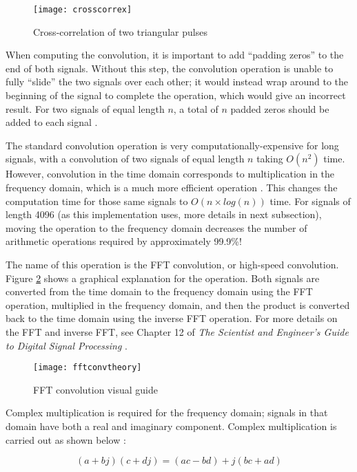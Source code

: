 \documentclass[11pt]{ucthesisCP}
\begin{document}
\begin{figure}[htbp]
	\centering
	\texttt{[image: crosscorrex]}
	\caption{Cross-correlation of two triangular pulses}
	\label{fig:crosscorrex}
\end{figure}

When computing the convolution, it is important to add “padding zeros” to the end of both signals. Without this step, the convolution operation is unable to fully “slide” the two signals over each other; it would instead wrap around to the beginning of the signal to complete the operation, which would give an incorrect result. For two signals of equal length \(n\), a total of \(n\) padded zeros should be added to each signal \cite{dspguide}.

The standard convolution operation is very computationally-expensive for long signals, with a convolution of two signals of equal length \(n\) taking \(O(n^2)\) time. However, convolution in the time domain corresponds to multiplication in the frequency domain, which is a much more efficient operation \cite{dspguide}. This changes the computation time for those same signals to \(O(n \times log(n))\) time. For signals of length 4096 (as this implementation uses, more details in next subsection), moving the operation to the frequency domain decreases the number of arithmetic operations required by approximately 99.9\%!

The name of this operation is the FFT convolution, or high-speed convolution. Figure \ref{fig:fftconvtheory} shows a graphical explanation for the operation. Both signals are converted from the time domain to the frequency domain using the FFT operation, multiplied in the frequency domain, and then the product is converted back to the time domain using the inverse FFT operation. For more details on the FFT and inverse FFT, see Chapter 12 of \textit{The Scientist and Engineer’s Guide to Digital Signal Processing} \cite{dspguide}. 

\begin{figure}[htbp]
	\centering
	\texttt{[image: fftconvtheory]}
	\caption{FFT convolution visual guide \cite{dspguide}}
	\label{fig:fftconvtheory}
\end{figure}

Complex multiplication is required for the frequency domain; signals in that domain have both a real and imaginary component. Complex multiplication is carried out as shown below \cite{dspguide}:

\begin{equation} \label{eq:3eq2}
	(a + bj) (c + dj) = (ac - bd) + j(bc + ad)
\end{equation}
\end{document}
